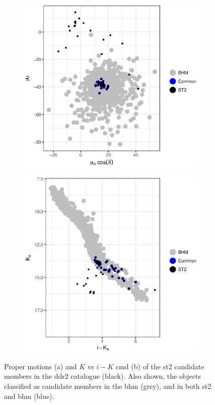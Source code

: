 \begin{figure}[ht!]
    \centering
    \begin{subfigure}[t]{0.45\textwidth}
    \centering
       \includegraphics[width=\textwidth]{background/Figures/ST2_pm.eps}
    \end{subfigure}
    \begin{subfigure}[t]{0.45\textwidth}
    \centering
     \includegraphics[width=\textwidth]{background/Figures/ST2_ph.eps}
        \caption{}
    \end{subfigure}
\caption{Proper motions (a) and $K$ vs $i-K$ \gls{cmd} (b) of the \gls{st2} candidate members in the \gls{ddr2} catalogue (black). Also shown, the objects classified as candidate members in the \gls{bhm} (grey), and in  both \gls{st2} and \gls{bhm} (blue).}
\label{fig:ST2}
\end{figure}

